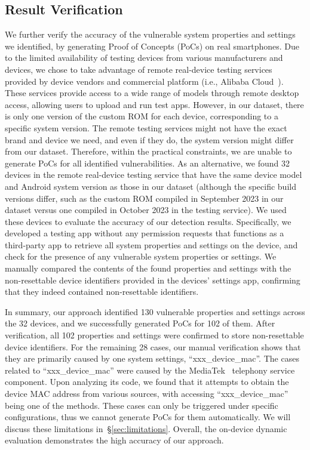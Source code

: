 \subsection{Result Verification}
We further verify the accuracy of the vulnerable system properties and settings we identified, by generating Proof of Concepts (PoCs) on real smartphones.
Due to the limited availability of testing devices from various manufacturers and devices, we chose to take advantage of remote real-device testing services provided by device vendors and commercial platform (i.e., Alibaba Cloud~\cite{aliyun}). 
These services provide access to a wide range of models through remote desktop access, allowing users to upload and run test apps.
However, in our dataset, there is only one version of the custom ROM for each device, corresponding to a specific system version. 
The remote testing services might not have the exact brand and device we need, and even if they do, the system version might differ from our dataset.
Therefore, within the practical constraints, we are unable to generate PoCs for all identified vulnerabilities. 
As an alternative, we found 32 devices in the remote real-device testing service that have the same device model and Android system version as those in our dataset (although the specific build versions differ, such as the custom ROM compiled in September 2023 in our dataset versus one compiled in October 2023 in the testing service). 
We used these devices to evaluate the accuracy of our detection results.
Specifically, we developed a testing app without any permission requests that functions as a third-party app to retrieve all system properties and settings on the device, and check for the presence of any vulnerable system properties or settings.
We manually compared the contents of the found properties and settings with the non-resettable device identifiers provided in the devices' settings app, confirming that they indeed contained non-resettable identifiers.

In summary, our approach identified 130 vulnerable properties and settings across the 32 devices, and we successfully generated PoCs for 102 of them. 
After verification, all 102 properties and settings were confirmed to store non-resettable device identifiers.
For the remaining 28 cases, our manual verification shows that they are primarily caused by one system settings, ``xxx\_device\_mac''.
The cases related to ``xxx\_device\_mac'' were caused by the MediaTek~\cite{mtk} telephony service component. 
Upon analyzing its code, we found that it attempts to obtain the device MAC address from various sources, with accessing ``xxx\_device\_mac'' being one of the methods.
These cases can only be triggered under specific configurations, thus we cannot generate PoCs for them automatically.
We will discuss these limitations in~\S\ref{sec:limitations}.
Overall, the on-device dynamic evaluation demonstrates the high accuracy of our approach.

